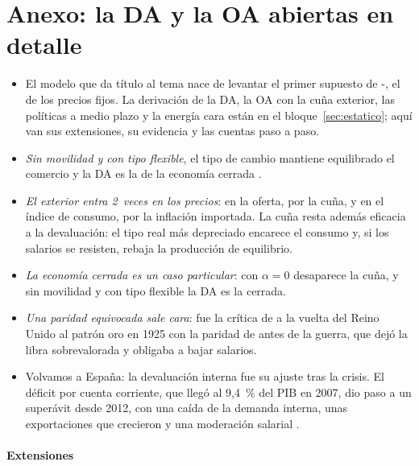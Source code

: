 \documentclass[11pt]{article}
\begin{document}
\section{Anexo: la DA y la OA abiertas en detalle}\label{anexo:oa-da}

\begin{itemize}
\item El modelo que da título al tema nace de levantar el primer supuesto de -, el de los precios fijos. La derivación de la DA, la OA con la cuña exterior, las políticas a medio plazo y la energía cara están en el bloque~\ref{sec:estatico}; aquí van sus extensiones, su evidencia y las cuentas paso a paso.
\item \emph{Sin movilidad y con tipo flexible}, el tipo de cambio mantiene equilibrado el comercio y la DA es la de la economía cerrada .
\item \emph{El exterior entra 2~veces en los precios}: en la oferta, por la cuña, y en el índice de consumo, por la inflación importada. La cuña resta además eficacia a la devaluación: el tipo real más depreciado encarece el consumo y, si los salarios se resisten, rebaja la producción de equilibrio\nocite{CarlinSoskice2015Macroeconomics}.
\item \emph{La economía cerrada es un caso particular}: con $\alpha=0$ desaparece la cuña, y sin movilidad y con tipo flexible la DA es la cerrada.
\item \emph{Una paridad equivocada sale cara}: fue la crítica de \textcite{Keynes1925Churchill} a la vuelta del Reino Unido al patrón oro en 1925 con la paridad de antes de la guerra, que dejó la libra sobrevalorada y obligaba a bajar salarios.
\item Volvamos a España: la devaluación interna fue su ajuste tras la crisis. El déficit por cuenta corriente, que llegó al 9,4~\% del PIB en 2007, dio paso a un superávit desde 2012\nocite{BdE2026BE17}, con una caída de la demanda interna, unas exportaciones que crecieron y una moderación salarial .
\end{itemize}

\paragraph{Extensiones}
\end{document}
